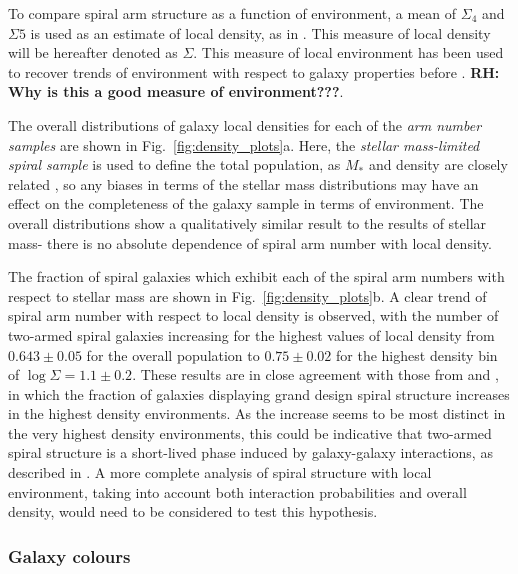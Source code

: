 \documentclass[useAMS,usenatbib]{mn2e}
\newcommand{\rh}[1]{{\bf \textcolor{RoyalPurple}{RH: #1}}}
\begin{document}
To compare spiral arm structure as a function of environment, a mean of $\Sigma_4$ and $\Sigma5$ is used as an estimate of local density, as in \citet{Baldry_06}. This measure of local density will be hereafter denoted as $\Sigma$. This measure of local environment has been used to recover trends of environment with respect to galaxy properties before \citep{Baldry_06,Bamford_09}. \rh{Why is this a good measure of environment???}.

The overall distributions of galaxy local densities for each of the \textit{arm number samples} are shown in Fig.~\ref{fig:density_plots}a. Here, the \textit{stellar mass-limited spiral sample} is used to define the total population, as $M_*$ and density are closely related \citep{Baldry_06}, so any biases in terms of the stellar mass distributions may have an effect on the completeness of the galaxy sample in terms of environment. The overall distributions show a qualitatively similar result to the results of stellar mass- there is no absolute dependence of spiral arm number with local density. 

The fraction of spiral galaxies which exhibit each of the spiral arm numbers with respect to stellar mass are shown in Fig.~\ref{fig:density_plots}b. A clear trend of spiral arm number with respect to local density is observed, with the number of two-armed spiral galaxies increasing for the highest values of local density from $0.643 \pm 0.05$ for the overall population to $0.75 \pm 0.02$ for the highest density bin of $\log \Sigma = 1.1 \pm 0.2$. These results are in close agreement with those from \citet{EE_82} and \citet{Ann_14}, in which the fraction of galaxies displaying grand design spiral structure increases in the highest density environments. As the increase seems to be most distinct in the very highest density environments, this could be indicative that two-armed spiral structure is a  short-lived phase induced by galaxy-galaxy interactions, as described in \citet{EE_86}. A more complete analysis of spiral structure with local environment, taking into account both interaction probabilities and overall density, would need to be considered to test this hypothesis.


\subsubsection{Galaxy colours}
\label{sec:colours}
\end{document}

